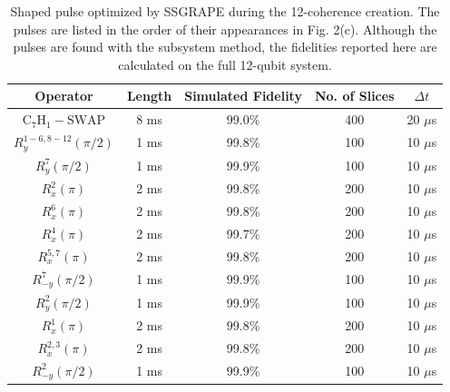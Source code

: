 \documentclass[twocolumn,reprint, amsmath,amssymb,showpacs,superscriptaddress]{revtex4-1}
\begin{document}


\begin{table}[b]
{\footnotesize
\setlength{\abovecaptionskip}{0.50cm}
\begin{tabular} {c||c|c|c|c}
\hline
  \hline
  Operator & Length & Simulated Fidelity & No. of Slices & $\Delta t$ \\
  \hline
  $\text{C}_7\text{H}_1 - \text{SWAP}$ & 8 ms & 99.0\% & 400 & 20 $\mu$s \\
  $R_y^{1-6,8-12}(\pi/2)$ & 1 ms & 99.8\% & 100 & 10 $\mu$s\\
  $R_y^7(\pi/2)$ & 1 ms & 99.9\% & 100 & 10 $\mu$s\\
  $R_x^2(\pi)$ & 2 ms & 99.8\% & 200 & 10 $\mu$s\\
  $R_x^6(\pi)$ & 2 ms & 99.8\% & 200 & 10 $\mu$s\\
  $R_x^4(\pi)$ & 2 ms & 99.7\% & 200 & 10 $\mu$s\\
  $R_x^{5,7}(\pi)$ & 2 ms & 99.8\% & 200 & 10 $\mu$s\\
  $R_{-y}^7(\pi/2)$ & 1 ms & 99.9\% & 100 & 10 $\mu$s\\
  $R_y^2(\pi/2)$ & 1 ms & 99.9\% & 100 & 10 $\mu$s\\
  $R_x^1(\pi)$ & 2 ms & 99.8\% & 200 & 10 $\mu$s\\
  $R_x^{2,3}(\pi)$ & 2 ms & 99.8\% & 200 & 10 $\mu$s\\
  $R_{-y}^2(\pi/2)$ & 1 ms & 99.9\% & 100 & 10 $\mu$s\\
  \hline
  \hline
\end{tabular}
}
\caption{Shaped pulse optimized by SSGRAPE during the 12-coherence creation. The pulses are listed in the order of their appearances in Fig. 2(c). Although the pulses are found with the subsystem method, the fidelities reported here are calculated on the full 12-qubit system.}
\label{tableop}
\end{table}
\end{document}
